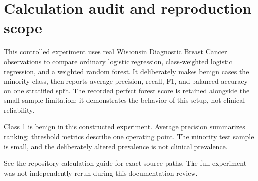 \documentclass[11pt]{article}
\begin{document}
\section{Calculation audit and reproduction scope}
This controlled experiment uses real Wisconsin Diagnostic Breast Cancer observations to compare ordinary logistic regression, class-weighted logistic regression, and a weighted random forest. It deliberately makes benign cases the minority class, then reports average precision, recall, F1, and balanced accuracy on one stratified split. The recorded perfect forest score is retained alongside the small-sample limitation: it demonstrates the behavior of this setup, not clinical reliability.

Class 1 is benign in this constructed experiment. Average precision summarizes ranking; threshold metrics describe one operating point. The minority test sample is small, and the deliberately altered prevalence is not clinical prevalence.

See the repository calculation guide for exact source paths. The full experiment was not independently rerun during this documentation review.
\end{document}
